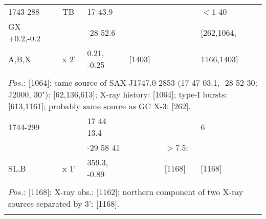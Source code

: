 \documentclass{aa}
\begin{document}
\begin{tabular}{p{2.5cm}p{1cm}p{1.8cm}p{2.3cm}p{3.3cm}p{2.0cm}p{2.2cm}}
\noalign{\smallskip}
1743-288                & TB           & 17 43.9               &                       &                          & $<$1-40                            &              \\
GX +0.2,-0.2           &                 & -28 52.6              &                       &                          & [262,1064,                        &                 \\
A,B,X                       & x 2'          & 0.21, -0.25          & [1403]           &                         & 1166,1403]                       &            \\
\\
\multicolumn{7}{p{17.5cm}}{
$Pos$.: [1064]; same source of SAX J1747.0-2853 (17 47 03.1, -28 52 30; J2000, 30"): [62,136,613]; X-ray history: [1064]; 
type-I bursts: [613,1161]; probably same source as GC X-3: [262].}\\
\noalign{\smallskip}
\hline

\noalign{\smallskip}
1744-299        &                   & 17 44 13.4            &                     &                          & 6                   &            \\
                         &                   & -29 58 41              &                     & $>$7.5:            &                      &                \\
      SL,B          & x 1'            & 359.3, -0.89          &                     &  [1168]            & [1168]          &          \\
\\
\multicolumn{7}{p{17.5cm}}{
$Pos$.: [1168]; X-ray obs.: [1162]; northern component of two X-ray sources separated by 3': [1168].}\\
\noalign{\smallskip}
\hline

\end{tabular}
\end{document}

